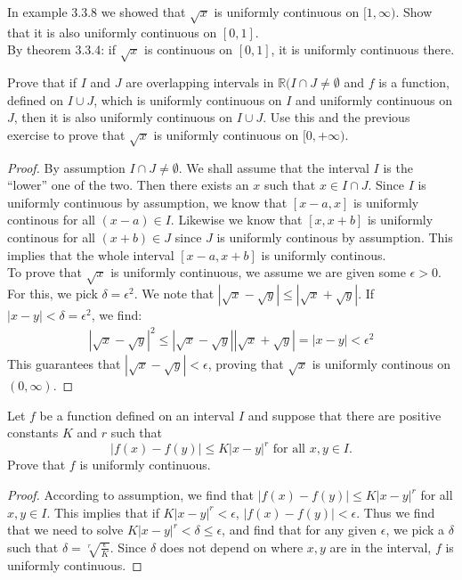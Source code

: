 \documentclass[12pt]{book}
\newcommand{\R}{\mathbb{R}}
\newenvironment{exercise}[2][Exercise]{\begin{trivlist}
\item[\hskip \labelsep {\bfseries #1}\hskip \labelsep {\bfseries #2.}]}{\end{trivlist}}
\begin{document}
\begin{exercise}{3.3.5}
    In example 3.3.8 we showed that $\sqrt{x}$ is uniformly continuous on $[1,\infty)$. Show that it is also uniformly continuous on $[0,1]$. \\
    
    By theorem 3.3.4: if $\sqrt{x}$ is continuous on $[0,1]$, it is uniformly continuous there.
\end{exercise}


\begin{exercise}{3.3.6}
Prove that if $I$ and $J$ are overlapping intervals in $\R (I \cap J \neq \emptyset$ and $f$ is a function, defined on $I \cup J$, which is uniformly continuous on $I$ and uniformly continuous on $J$, then it is also uniformly continuous on $I \cup J$. Use this and the previous exercise to prove that $\sqrt{x}$ is uniformly continuous on $[0, + \infty)$. 

	\begin{proof}
	By assumption $I \cap J \neq \emptyset$. We shall assume that the interval $I$ is the ``lower'' one of the two. Then there exists an $x$ such that $x \in I \cap J$. Since $I$ is uniformly continuous by assumption, we know that $[x-a,x]$ is uniformly continous for all $(x-a)\in I$. Likewise we know that $[x,x+b]$ is uniformly continous for all $(x+b)\in J$ since $J$ is uniformly continous by assumption. This implies that the whole interval $[x-a, x+b]$ is uniformly continous. \\
	To prove that $\sqrt{x}$ is uniformly continuous, we assume we are given some $\epsilon >0$. For this, we pick $\delta=\epsilon^2$. We note that $|\sqrt{x} - \sqrt{y}| \leq |\sqrt{x} + \sqrt{y}|$. If $|x-y|< \delta = \epsilon^2$, we find:
		\begin{align*}
		|\sqrt{x} - \sqrt{y}|^2 \leq |\sqrt{x} - \sqrt{y}| |\sqrt{x}+\sqrt{y}| = |x-y| < \epsilon^2
		\end{align*}
	This guarantees that $|\sqrt{x} - \sqrt{y}|<\epsilon$, proving that $\sqrt{x}$ is uniformly continous on $(0,\infty)$.
	\end{proof}
\end{exercise}



\begin{exercise}{3.3.8}
Let $f$ be a function defined on an interval $I$ and suppose that there are positive constants $K$ and $r$ such that 
	\[ |f(x)-f(y)| \leq K |x-y|^r \text{ for all } x,y \in I. \]
Prove that $f$ is uniformly continuous.

	\begin{proof}
	According to assumption, we find that $|f(x)-f(y)| \leq K |x-y|^r$ for all $x,y \in I$. This implies that if $K | x-y|^r < \epsilon$, $|f(x)-f(y)|<\epsilon$. Thus we find that we need to solve $K |x-y|^r < \delta \leq \epsilon$, and find that for any given $\epsilon$, we pick a $\delta$ such that $\delta = \sqrt[r]{\frac{\epsilon}{K}}$. Since $\delta$ does not depend on where $x,y$ are in the interval, $f$ is uniformly continuous.
	\end{proof}
\end{exercise}
\end{document}
